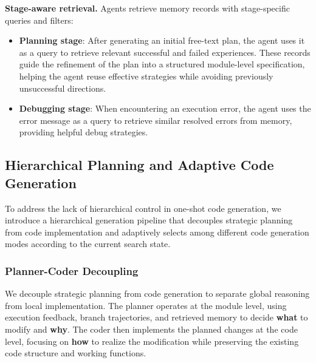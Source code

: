\textbf{Stage-aware retrieval.}
Agents retrieve memory records with stage-specific queries and filters:
\begin{itemize}[leftmargin=*]
    \item \textbf{Planning stage}: After generating an initial free-text plan, the agent uses it as a query to retrieve relevant successful and failed experiences. These records guide the refinement of the plan into a structured module-level specification, helping the agent reuse effective strategies while avoiding previously unsuccessful directions.
    
    \item \textbf{Debugging stage}: When encountering an execution error, the agent uses the error message as a query to retrieve similar resolved errors from memory, providing helpful debug strategies.
\end{itemize}


\subsection{Hierarchical Planning and Adaptive Code Generation}
\label{sec:codegen}

To address the lack of hierarchical control in one-shot code generation, we introduce a hierarchical generation pipeline that decouples strategic planning from code implementation and adaptively selects among different code generation modes according to the current search state.

\subsubsection{Planner-Coder Decoupling}

We decouple strategic planning from code generation to separate global reasoning from local implementation. The planner operates at the module level, using execution feedback, branch trajectories, and retrieved memory to decide \textbf{what} to modify and \textbf{why}. The coder then implements the planned changes at the code level, focusing on \textbf{how} to realize the modification while preserving the existing code structure and working functions.


